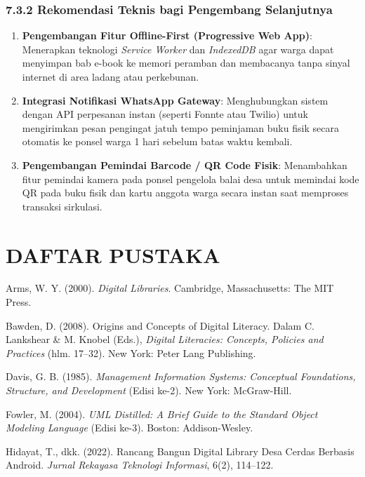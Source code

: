 \documentclass[
  indonesian,
  12pt,
]{report}
\providecommand{\tightlist}{%
  \setlength{\itemsep}{0pt}\setlength{\parskip}{0pt}}
\begin{document}
\subsection{7.3.2 Rekomendasi Teknis bagi Pengembang
Selanjutnya}\label{rekomendasi-teknis-bagi-pengembang-selanjutnya}

\begin{enumerate}
\def\labelenumi{\arabic{enumi}.}
\tightlist
\item
  \textbf{Pengembangan Fitur Offline-First (Progressive Web App)}:
  Menerapkan teknologi \emph{Service Worker} dan \emph{IndexedDB} agar
  warga dapat menyimpan bab e-book ke memori peramban dan membacanya
  tanpa sinyal internet di area ladang atau perkebunan.
\item
  \textbf{Integrasi Notifikasi WhatsApp Gateway}: Menghubungkan sistem
  dengan API perpesanan instan (seperti Fonnte atau Twilio) untuk
  mengirimkan pesan pengingat jatuh tempo peminjaman buku fisik secara
  otomatis ke ponsel warga 1 hari sebelum batas waktu kembali.
\item
  \textbf{Pengembangan Pemindai Barcode / QR Code Fisik}: Menambahkan
  fitur pemindai kamera pada ponsel pengelola balai desa untuk memindai
  kode QR pada buku fisik dan kartu anggota warga secara instan saat
  memproses transaksi sirkulasi.
\end{enumerate}

\newpage

\chapter*{DAFTAR PUSTAKA}\label{daftar-pustaka}

Arms, W. Y. (2000). \emph{Digital Libraries}. Cambridge, Massachusetts:
The MIT Press.

Bawden, D. (2008). Origins and Concepts of Digital Literacy. Dalam C.
Lankshear \& M. Knobel (Eds.), \emph{Digital Literacies: Concepts,
Policies and Practices} (hlm. 17--32). New York: Peter Lang Publishing.

Davis, G. B. (1985). \emph{Management Information Systems: Conceptual
Foundations, Structure, and Development} (Edisi ke-2). New York:
McGraw-Hill.

Fowler, M. (2004). \emph{UML Distilled: A Brief Guide to the Standard
Object Modeling Language} (Edisi ke-3). Boston: Addison-Wesley.

Hidayat, T., dkk. (2022). Rancang Bangun Digital Library Desa Cerdas
Berbasis Android. \emph{Jurnal Rekayasa Teknologi Informasi}, 6(2),
114--122.
\end{document}
